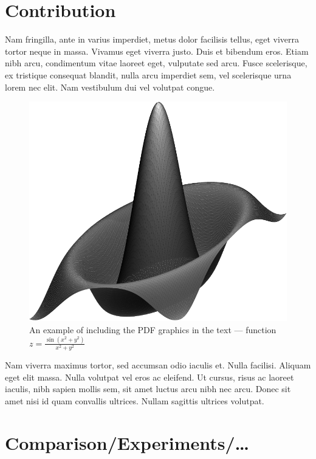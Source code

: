 \documentclass[10pt]{article}
\begin{document}
\section{Contribution}

Nam fringilla, ante in varius imperdiet, metus dolor facilisis tellus, eget viverra tortor neque in massa. Vivamus eget viverra justo. Duis et bibendum eros. Etiam nibh arcu, condimentum vitae laoreet eget, vulputate sed arcu. Fusce scelerisque, ex tristique consequat blandit, nulla arcu imperdiet sem, vel scelerisque urna lorem nec elit. Nam vestibulum dui vel volutpat congue.

\begin{figure}[!ht]
\centering
\includegraphics[scale=.4]{surfz}
\caption{An example of including the PDF graphics in the text ---
function $z=\frac{\sin(x^2+y^2)}{x^2+y^2}$}
\label{rys:surf}
\end{figure}

Nam viverra maximus tortor, sed accumsan odio iaculis et. Nulla facilisi. Aliquam eget elit massa. Nulla volutpat vel eros ac eleifend. Ut cursus, risus ac laoreet iaculis, nibh sapien mollis sem, sit amet luctus arcu nibh nec arcu. Donec sit amet nisi id quam convallis ultrices. Nullam sagittis ultrices volutpat. 

\section{Comparison/Experiments/\ldots}
\end{document}
